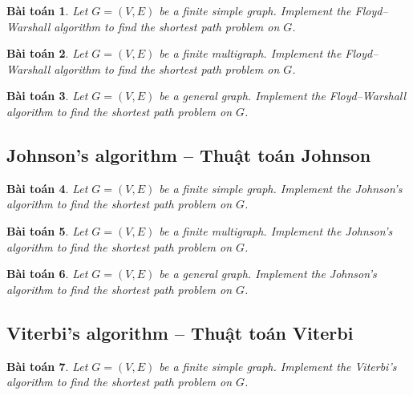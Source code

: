 \documentclass{article}
\newtheorem{baitoan}{Bài toán}
\begin{document}
\begin{baitoan}
    Let $G = (V,E)$ be a finite simple graph. Implement the Floyd--Warshall algorithm to find the shortest path problem on $G$.
\end{baitoan}

\begin{baitoan}
    Let $G = (V,E)$ be a finite multigraph. Implement the Floyd--Warshall algorithm to find the shortest path problem on $G$.
\end{baitoan}

\begin{baitoan}
    Let $G = (V,E)$ be a general graph. Implement the Floyd--Warshall algorithm to find the shortest path problem on $G$.
\end{baitoan}


\subsection{Johnson's algorithm -- Thuật toán Johnson}

\begin{baitoan}
    Let $G = (V,E)$ be a finite simple graph. Implement the Johnson's algorithm to find the shortest path problem on $G$.
\end{baitoan}

\begin{baitoan}
    Let $G = (V,E)$ be a finite multigraph. Implement the Johnson's algorithm to find the shortest path problem on $G$.
\end{baitoan}

\begin{baitoan}
    Let $G = (V,E)$ be a general graph. Implement the Johnson's algorithm to find the shortest path problem on $G$.
\end{baitoan}


\subsection{Viterbi's algorithm -- Thuật toán Viterbi}

\begin{baitoan}
    Let $G = (V,E)$ be a finite simple graph. Implement the Viterbi's algorithm to find the shortest path problem on $G$.
\end{baitoan}
\end{document}
